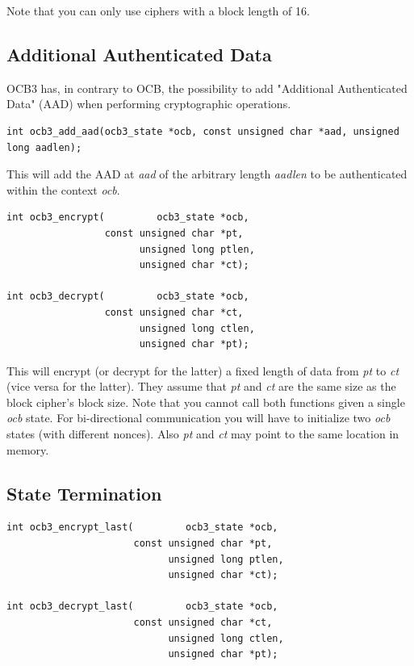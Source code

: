\documentclass[synpaper]{book}
\begin{document}
Note that you can only use ciphers with a block length of 16.

\subsection{Additional Authenticated Data}

OCB3 has, in contrary to OCB, the possibility to add "Additional Authenticated Data" (AAD) when performing cryptographic operations.

\begin{verbatim}
int ocb3_add_aad(ocb3_state *ocb, const unsigned char *aad, unsigned long aadlen);
\end{verbatim}

This will add the AAD at \textit{aad} of the arbitrary length \textit{aadlen} to be authenticated within the context \textit{ocb}.

 
\begin{verbatim}
int ocb3_encrypt(         ocb3_state *ocb,
                 const unsigned char *pt,
                       unsigned long ptlen,
                       unsigned char *ct);

int ocb3_decrypt(         ocb3_state *ocb,
                 const unsigned char *ct,
                       unsigned long ctlen,
                       unsigned char *pt);
\end{verbatim}

This will encrypt (or decrypt for the latter) a fixed length of data from \textit{pt} to \textit{ct} (vice versa for the latter).
They assume that \textit{pt} and \textit{ct} are the same size as the block cipher's block size.  Note that you cannot call
both functions given a single \textit{ocb} state.  For bi-directional communication you will have to initialize two \textit{ocb}
states (with different nonces).  Also \textit{pt} and \textit{ct} may point to the same location in memory.

\subsection{State Termination}

 
\begin{verbatim}
int ocb3_encrypt_last(         ocb3_state *ocb,
                      const unsigned char *pt,
                            unsigned long ptlen,
                            unsigned char *ct);

int ocb3_decrypt_last(         ocb3_state *ocb,
                      const unsigned char *ct,
                            unsigned long ctlen,
                            unsigned char *pt);
\end{verbatim}
\end{document}
